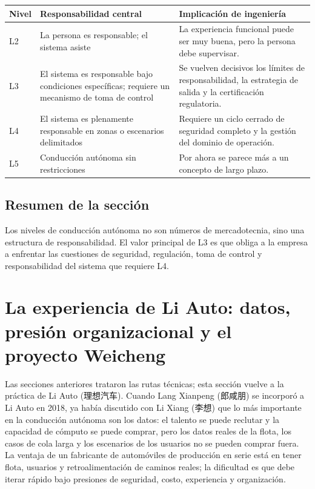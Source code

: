 \documentclass[a4paper]{article}
\begin{document}
\noindent\begin{tabularx}{\textwidth}{p{}p{}X}
\toprule
Nivel & Responsabilidad central & Implicación de ingeniería \\
\midrule
L2 & La persona es responsable; el sistema asiste & La experiencia funcional puede ser muy buena, pero la persona debe supervisar. \\
L3 & El sistema es responsable bajo condiciones específicas; requiere un mecanismo de toma de control & Se vuelven decisivos los límites de responsabilidad, la estrategia de salida y la certificación regulatoria. \\
L4 & El sistema es plenamente responsable en zonas o escenarios delimitados & Requiere un ciclo cerrado de seguridad completo y la gestión del dominio de operación. \\
L5 & Conducción autónoma sin restricciones & Por ahora se parece más a un concepto de largo plazo. \\
\bottomrule
\end{tabularx}

\subsection{Resumen de la sección}

Los niveles de conducción autónoma no son números de mercadotecnia, sino una estructura de responsabilidad. El valor principal de L3 es que obliga a la empresa a enfrentar las cuestiones de seguridad, regulación, toma de control y responsabilidad del sistema que requiere L4.
\section{La experiencia de Li Auto: datos, presión organizacional y el proyecto Weicheng}

Las secciones anteriores trataron las rutas técnicas; esta sección vuelve a la práctica de Li Auto (理想汽车). Cuando Lang Xianpeng (郎咸朋) se incorporó a Li Auto en 2018, ya había discutido con Li Xiang (李想) que lo más importante en la conducción autónoma son los datos: el talento se puede reclutar y la capacidad de cómputo se puede comprar, pero los datos reales de la flota, los casos de cola larga y los escenarios de los usuarios no se pueden comprar fuera. La ventaja de un fabricante de automóviles de producción en serie está en tener flota, usuarios y retroalimentación de caminos reales; la dificultad es que debe iterar rápido bajo presiones de seguridad, costo, experiencia y organización.
\end{document}
